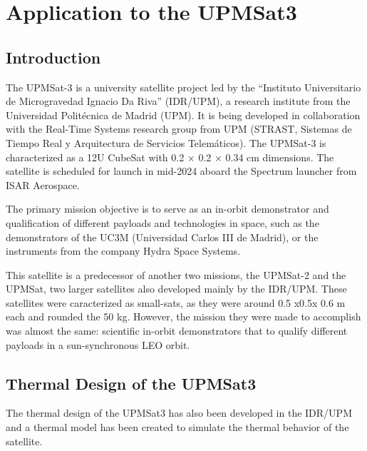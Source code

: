 \chapter{Application to the UPMSat3}\label{ch:03}
\section{Introduction}

The UPMSat-3 is a university satellite project led by the “Instituto Universitario de Microgravedad  Ignacio Da Riva” (IDR/UPM), a research institute from the Universidad Politécnica de Madrid (UPM). It is being developed in collaboration with the Real-Time Systems research group from UPM (STRAST, Sistemas de Tiempo Real y Arquitectura de Servicios Telemáticos). The UPMSat-3 is characterized as a 12U CubeSat with 0.2 × 0.2 × 0.34 cm dimensions. The satellite is scheduled for launch in mid-2024 aboard the Spectrum launcher from ISAR Aerospace. 

The primary mission objective is to serve as an in-orbit demonstrator and qualification of
different payloads and technologies in space, such as the demonstrators of the UC3M (Universidad Carlos III de Madrid), or the instruments from the company Hydra Space Systems.

This satellite is a predecessor of another two missions, the UPMSat-2 and the UPMSat, two larger satellites also developed mainly by the IDR/UPM. These satellites were caracterized as small-sats, as they were around 0.5 x0.5x 0.6 m each and rounded the 50 kg. However, the mission they were made to accomplish was almost the same: scientific in-orbit demonstrators that to qualify different payloads in a sun-synchronous LEO orbit.


\section{Thermal Design of the UPMSat3}
The thermal design of the UPMSat3 has also been developed in the IDR/UPM and a thermal model has been created to simulate the thermal behavior of the satellite. 

